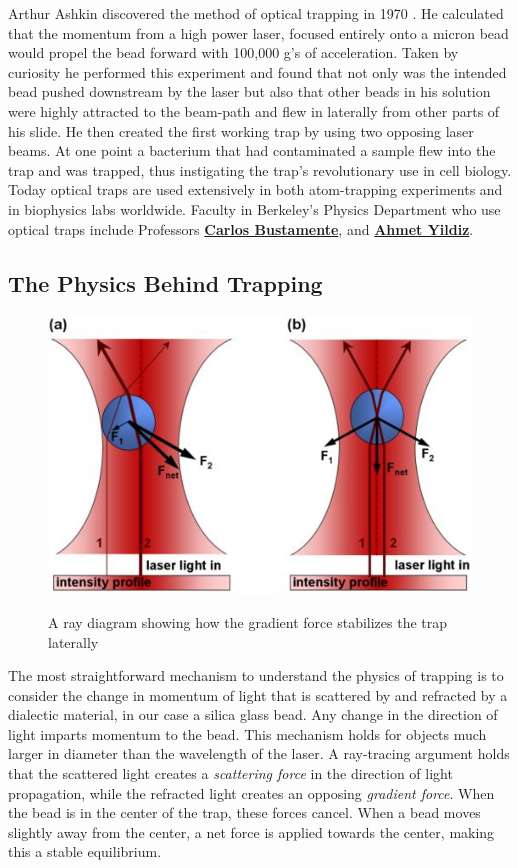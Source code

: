 \documentclass{../lab}
\begin{document}
Arthur Ashkin discovered the method of optical trapping in 1970 \cite{Ashkin1970,Ashkin1997}. He calculated that the momentum from a high power laser, focused entirely onto a micron bead would propel the bead forward with 100,000 g's of acceleration. Taken by curiosity he performed this experiment and found that not only was the intended bead pushed downstream by the laser but also that other beads in his solution were highly attracted to the beam-path and flew in laterally from other parts of his slide. He then created the first working trap by using two opposing laser beams. At one point a bacterium that had contaminated a sample flew into the trap and was trapped, thus instigating the trap's revolutionary use in cell biology. Today optical traps are used extensively in both atom-trapping experiments and in biophysics labs worldwide. Faculty in Berkeley's Physics Department who use optical traps include Professors \href{http://physics.berkeley.edu/people/faculty/carlos-bustamante}{\textbf{Carlos Bustamente}}, and \href{http://physics.berkeley.edu/people/faculty/ahmet-yildiz}{\textbf{Ahmet Yildiz}}.

\subsection{The Physics Behind Trapping}

\begin{figure}[h]
    \centering
    \href{http://experimentationlab.berkeley.edu/sites/default/files/images/500px-Optical_Trap_Ray_Optics_Explanation.jpg}{\includegraphics[width=0.5\linewidth]{images/500px-Optical_Trap_Ray_Optics_Explanation.jpg}}
    \caption{A ray diagram showing how the gradient force stabilizes the trap laterally}
    \label{fig:500px-Optical_Trap_Ray_Optics_Explanation}
\end{figure}

The most straightforward mechanism to understand the physics of trapping is to consider the change in momentum of light that is scattered by and refracted by a dialectic material, in our case a silica glass bead. Any change in the direction of light imparts momentum to the bead. This mechanism holds for objects much larger in diameter than the wavelength of the laser. A ray-tracing argument holds that the scattered light creates a \emph{scattering force} in the direction of light propagation, while the refracted light creates an opposing \emph{gradient force}. When the bead is in the center of the trap, these forces cancel. When a bead moves slightly away from the center, a net force is applied towards the center, making this a stable equilibrium.
\end{document}
